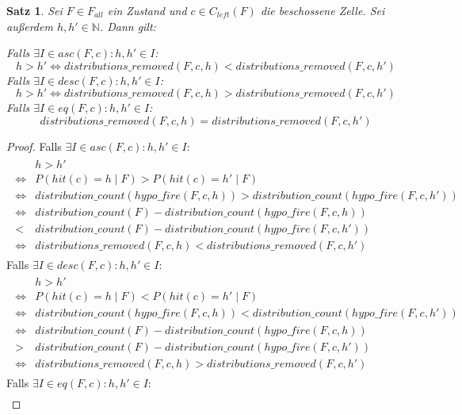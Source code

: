 \documentclass[a4paper,12pt]{llncs}
\numberwithin{equation}{section}
\newtheorem{satz}{Satz}
\begin{document}
\begin{satz}
Sei $F\in F_{all}$ ein Zustand und $c \in C_{left}(F)$ die beschossene Zelle.
Sei außerdem $h,h' \in \mathbb{N}$.
Dann gilt:

Falls $\exists I \in asc(F, c) \colon h,h' \in I$:
\[
h > h' \Leftrightarrow distributions\_removed(F,c, h) < distributions\_removed(F,c, h')
\]
Falls $\exists I \in desc(F, c) \colon h,h' \in I$:
\[
h > h' \Leftrightarrow distributions\_removed(F,c, h) > distributions\_removed(F,c, h')
\]
Falls $\exists I \in eq(F, c) \colon h,h' \in I$:
\[
distributions\_removed(F,c, h) = distributions\_removed(F,c, h')
\]
\end{satz}
\begin{proof}
Falls $\exists I \in asc(F, c) \colon h,h' \in I$:
\begin{align}
\begin{split}
&h > h' \\
\Leftrightarrow &P(hit(c)=h \mid F) > P(hit(c)=h' \mid F) \\
\Leftrightarrow &distribution\_count(hypo\_fire(F,c, h)) > distribution\_count(hypo\_fire(F,c, h')) \\
\Leftrightarrow &distribution\_count(F) - distribution\_count(hypo\_fire(F,c, h)) \\
< &distribution\_count(F) - distribution\_count(hypo\_fire(F,c, h')) \\
\Leftrightarrow &distributions\_removed(F,c, h) < distributions\_removed(F,c, h')
\nonumber
\end{split}
\end{align}
Falls $\exists I \in desc(F, c) \colon h,h' \in I$:
\begin{align}
\begin{split}
&h > h' \\
\Leftrightarrow &P(hit(c)=h \mid F) < P(hit(c)=h' \mid F) \\
\Leftrightarrow &distribution\_count(hypo\_fire(F,c, h)) < distribution\_count(hypo\_fire(F,c, h')) \\
\Leftrightarrow &distribution\_count(F) - distribution\_count(hypo\_fire(F,c, h)) \\
> &distribution\_count(F) - distribution\_count(hypo\_fire(F,c, h')) \\
\Leftrightarrow &distributions\_removed(F,c, h) > distributions\_removed(F,c, h')
\nonumber
\end{split}
\end{align}
Falls $\exists I \in eq(F, c) \colon h,h' \in I$:
\begin{align}

\end{align}
\end{proof}
\end{document}
